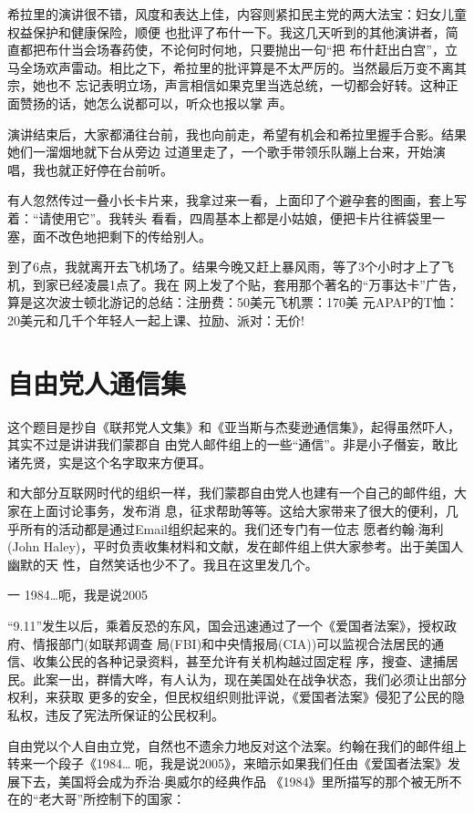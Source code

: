 ﻿\documentclass[11pt]{article}
\begin{document}
希拉里的演讲很不错，风度和表达上佳，内容则紧扣民主党的两大法宝：妇女儿童权益保护和健康保险，顺便
也批评了布什一下。我这几天听到的其他演讲者，简直都把布什当会场春药使，不论何时何地，只要抛出一句``把
布什赶出白宫''，立马全场欢声雷动。相比之下，希拉里的批评算是不太严厉的。当然最后万变不离其宗，她也不
忘记表明立场，声言相信如果克里当选总统，一切都会好转。这种正面赞扬的话，她怎么说都可以，听众也报以掌
声。

演讲结束后，大家都涌往台前，我也向前走，希望有机会和希拉里握手合影。结果她们一溜烟地就下台从旁边
过道里走了，一个歌手带领乐队蹦上台来，开始演唱，我也就正好停在台前听。

有人忽然传过一叠小长卡片来，我拿过来一看，上面印了个避孕套的图画，套上写着：``请使用它''。我转头
看看，四周基本上都是小姑娘，便把卡片往裤袋里一塞，面不改色地把剩下的传给别人。

到了6点，我就离开去飞机场了。结果今晚又赶上暴风雨，等了3个小时才上了飞机，到家已经凌晨1点了。我在
网上发了个贴，套用那个著名的``万事达卡''广告，算是这次波士顿北游记的总结：注册费：50美元飞机票：170美
元APAP的T恤：20美元和几千个年轻人一起上课、拉励、派对：无价!

\section{自由党人通信集}

这个题目是抄自《联邦党人文集》和《亚当斯与杰斐逊通信集》，起得虽然吓人，其实不过是讲讲我们蒙郡自
由党人邮件组上的一些``通信''。非是小子僭妄，敢比诸先贤，实是这个名字取来方便耳。

和大部分互联网时代的组织一样，我们蒙郡自由党人也建有一个自己的邮件组，大家在上面讨论事务，发布消
息，征求帮助等等。这给大家带来了很大的便利，几乎所有的活动都是通过Email组织起来的。我们还专门有一位志
愿者约翰$\cdot$海利(John Haley)，平时负责收集材料和文献，发在邮件组上供大家参考。出于美国人幽默的天
性，自然笑话也少不了。我且在这里发几个。

一 1984\ldots 呃，我是说2005

``9.11''发生以后，乘着反恐的东风，国会迅速通过了一个《爱国者法案》，授权政府、情报部门(如联邦调查
局(FBI)和中央情报局(CIA))可以监视合法居民的通信、收集公民的各种记录资料，甚至允许有关机构越过固定程
序，搜查、逮捕居民。此案一出，群情大哗，有人认为，现在美国处在战争状态，我们必须让出部分权利，来获取
更多的安全，但民权组织则批评说，《爱国者法案》侵犯了公民的隐私权，违反了宪法所保证的公民权利。

自由党以个人自由立党，自然也不遗余力地反对这个法案。约翰在我们的邮件组上转来一个段子《1984\ldots
呃，我是说2005》，来暗示如果我们任由《爱国者法案》发展下去，美国将会成为乔治$\cdot$奥威尔的经典作品
《1984》里所描写的那个被无所不在的``老大哥''所控制下的国家：
\end{document}
